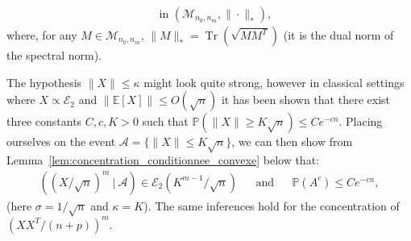 \documentclass{ws-rmta}
\DeclareMathOperator{\tr}{Tr}
\begin{document}
\begin{theorem}
{\begin{align*}
    &\text{ in } \left(\mathcal M_{n_0,n_m}, \| \cdot \|_*\right),
   \end{align*}
   where, for any $M \in \mathcal M_{n_0,n_m}$, $\|M\|_* = \tr(\sqrt{MM^T})$ (it is the dual norm of the spectral norm). 
   }

\end{theorem}
\begin{remark}\label{rem:quand_X_non_borne}
  The hypothesis $\|X\|\leq \kappa$ might look quite strong, however in classical settings where $X \propto \mathcal E_2$ and $\|\mathbb E[X]\|\leq O(\sqrt n)$ it has been shown that there exist three constants $C,c, K >0$ such that $\mathbb P(\|X \| \geq K\sqrt n) \leq C e^{-cn}$. Placing ourselves on the event $\mathcal A = \{\|X \| \leq K\sqrt n\}$, we can then show from Lemma~\ref{lem:concentration_conditionnee_convexe} below that:
  \begin{align*}
    \left( (X/\sqrt n)^m \ | \ \mathcal A \right) \in \mathcal E_2 \left(K^{m-1}/\sqrt n\right)&
    &\text{and}&
    &\mathbb P(A^c) \leq C e^{-cn},
  \end{align*}
  (here $\sigma = 1/\sqrt n$ and $\kappa = K$). The same inferences hold for the concentration of $(XX^T/(n+p))^m$.
\end{remark}
\end{document}
